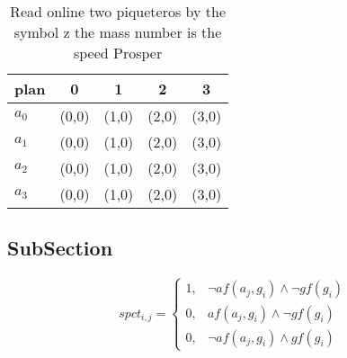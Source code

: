 \documentclass[a4paper]{article}
\begin{document}
\begin{table}
\begin{adjustbox}{width=0.7\columnwidth}
\begin{tabular}{|l|l|l|l|l|}
\hline
\textbf{plan} & \multicolumn{1}{c|}{\textbf{0}} & \multicolumn{1}{c|}{\textbf{1}} & \multicolumn{1}{c|}{\textbf{2}} & \multicolumn{1}{c|}{\textbf{3}} \\ \hline
\textbf{$a_0$}  & (0,0) & (1,0) & (2,0) & (3,0) \\ \hline
\textbf{$a_1$}  & (0,0) & (1,0) & (2,0) & (3,0) \\ \hline
\textbf{$a_2$}  & (0,0) & (1,0) & (2,0) & (3,0) \\ \hline
\textbf{$a_3$}  & (0,0) & (1,0) & (2,0) & (3,0) \\ \hline
\end{tabular}
\end{adjustbox}
\caption{Read online two piqueteros by the symbol z the mass number is the speed Prosper
}
\end{table}

\subsection{SubSection}

\begin{equation}
spct_{i,j} =
\begin{cases}
1, & \text{$\neg af(a_j,g_i) \wedge \neg gf(g_i)$}\\
0, & \text{$af(a_j,g_i) \wedge \neg gf(g_i)$}\\
0, & \text{$\neg af(a_j,g_i) \wedge gf(g_i)$}
\end{cases}
\end{equation}
\end{document}
